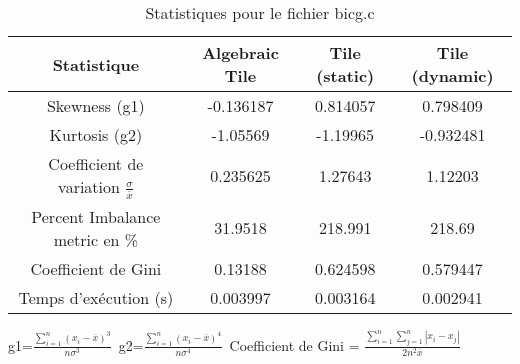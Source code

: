 \documentclass{article}
\begin{document}
\begin{table}[htbp]
  \centering
  \caption{Statistiques pour le fichier bicg.c}
  \begin{tabular}{|c|c|c|c|}
    \hline
    Statistique & Algebraic Tile & Tile (static) & Tile (dynamic) \\ 
    \hline
    Skewness (g1)  & -0.136187 & 0.814057 & 0.798409 \\ 
    Kurtosis (g2)  & -1.05569 & -1.19965 & -0.932481 \\ 
    Coefficient de variation $ \frac{\sigma}{\overline{x}} $ & 0.235625 & 1.27643 & 1.12203\\ 
    Percent Imbalance metric en \% & 31.9518 & 218.991 & 218.69\\ 
    Coefficient de Gini  & 0.13188 & 0.624598 & 0.579447\\ 
    Temps d'exécution (s) &  0.003997    &  0.003164   &  0.002941   \\ 

    \hline
  \end{tabular}
\end{table}
g1=$ \frac{\sum_{i=1}^{n} (x_i - \overline{x})^3}{n\sigma^3} $\
g2=$ \frac{\sum_{i=1}^{n} (x_i - \overline{x})^4}{n\sigma^4} $\
Coefficient de Gini = $ \frac{\sum_{i=1}^{n}\sum_{j=1}^{n} |x_i - x_j|}{2n^2\overline{x}} $\
\newpage
\end{document}
